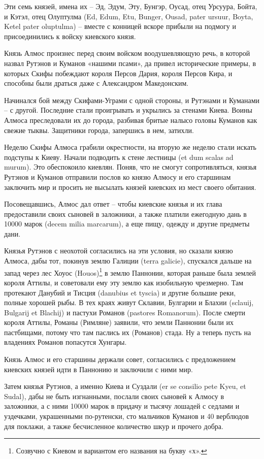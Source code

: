 Эти семь князей, имена их – Эд, Эдум, Эту, Бунгэр, Оусад, отец Урсуура, Бойта, и Кэтэл, отец Олуптулма (Ed, Edum, Etu, Bunger, Ousad, pater ursuur, Boyta, Ketel pater oluptulma) – вместе с конницей вскоре прибыли на подмогу и присоединились к войску киевского князя.

Князь Алмос произнес перед своим войском воодушевляющую речь, в которой назвал Рутэнов и Куманов «нашими псами», да привел исторические примеры, в которых Скифы побеждают короля Персов Дария, короля Персов Кира, и способны были драться даже с Александром Македонским.

Начинался бой между Скифами-Уграми с одной стороны, и Рутэнами и Куманами – с другой. Последние стали проигрывать и укрылись за стенами Киева. Воины Алмоса преследовали их до города, разбивая бритые налысо головы Куманов как свежие тыквы. Защитники города, запершись в нем, затихли.

Неделю Скифы Алмоса грабили окрестности, на вторую же неделю стали искать подступы к Киеву. Начали подводить к стене лестницы (et dum scalas ad murum). Это обеспокоило киевлян. Поняв, что не смогут сопротивляться, князья Рутэнов и Куманов отправили послов ко князю Алмосу и его старшинам заключить мир и просить не высылать князей киевских из мест своего обитания. 

Посовещавшись, Алмос дал ответ – чтобы киевские князья и их глава предоставили своих сыновей в заложники, а также платили ежегодную дань в 10000 марок (decem milia marcarum), а еще пищу, одежду и другие предметы дани.

Князья Рутэнов с неохотой согласились на эти условия, но сказали князю Алмоса, дабы тот, покинув землю Галиции (terra galicie), спускался дальше на запад через лес Хоуос (Houos)\footnote{Созвучно с Киевом и вариантом его названия на букву «х».} в землю Паннонии, которая раньше была землей короля Аттилы, и советовали ему эту землю как изобильную чрезмерно. Там протекают Данубий и Тисция (danubius et tyscia) и другие большие реки, полные хорошей рыбы. В тех краях живут Склавии, Булгарии и Блахии (sclauij, Bulgarij et Blachij) и пастухи Романов (pastores Romanorum). После смерти короля Аттилы, Романы (Римляне) заявили, что земли Паннонии были их пастбищами, потому что там паслись их (Романов) стада. Ну а теперь пусть на владениях Романов попасутся Хунгары. 

Князь Алмос и его старшины держали совет,  согласились с предложением киевских князей идти в Паннонию и заключили с ними мир.

Затем князья Рутэнов, а именно Киева и Суздали (er se consilio pete Kyeu, et Sudal), дабы не быть изгнанными, послали своих сыновей к Алмосу в заложники, а с ними 10000 марок в придачу и тысячу лошадей с седлами и уздечками, украшенными по-рутенски, сто мальчиков Куманов и 40 верблюдов для поклажи, а также бесчисленное количество шкур и прочего добра.

